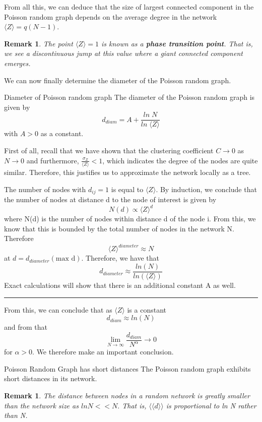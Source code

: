 \documentclass[twoside]{article}
\newtheorem{remark}[theorem]{Remark}
\newenvironment{proof}{{\bf Proof:}}{\hfill\rule{2mm}{2mm}}
\begin{document}
From all this, we can deduce that the size of largest connected component in the Poisson random graph depends on the average degree in the network $\langle Z \rangle = q(N - 1).$ 

\begin{remark}The point $\langle Z \rangle = 1$ is known as a \textbf{phase transition point}. That is, we see a discontinuous jump at this value where a giant connected component emerges.
\end{remark}

We can now finally determine the diameter of the Poisson random graph.

\begin{theorem_exam}{Diameter of Poisson random graph}{} The diameter of the Poisson random graph is given by
$$
d_{diam} = A + \frac{ln\;N}{ln\;\langle Z \rangle}
$$
with $A > 0$ as a constant.
\end{theorem_exam}
\begin{proof} 
First of all, recall that we have shown that the clustering coefficient $C \rightarrow 0$ as $N \rightarrow 0$ and furthermore, $\frac{\sigma_Z}{\langle Z \rangle} < 1$, which indicates the degree of the nodes are quite similar. Therefore, this justifies us to approximate the network locally as a tree. 

The number of nodes with $d_{ij} = 1$ is equal to $\langle Z \rangle.$ By induction, we conclude that the number of nodes at distance d to the node of interest is given by 
$$
N(d) \propto \langle Z \rangle^d
$$
where N(d) is the number of nodes within distance d of the node i. From this, we know that this is bounded by the total number of nodes in the network N. Therefore 
$$
\langle Z \rangle^{diameter} \approx N
$$
at $d = d_{diameter}(\text{max d}).$ Therefore, we have that 
$$
d_{diameter} \approx \frac{ln(N)}{ln(\langle Z \rangle)}
$$
Exact calculations will show that there is an additional constant A as well.
\end{proof}

From this, we can conclude that as $\langle Z \rangle$ is a constant 
$$
d_{diam} \approx ln(N)
$$
and from that 
$$
\lim_{N \rightarrow \infty}\frac{d_{diam}}{N^{\alpha}} \rightarrow 0
$$
for $\alpha > 0.$ We therefore make an important conclusion.
\begin{theorem_exam}{Poisson Random Graph has short distances}{} The Poisson random graph exhibits short distances in its network.
\end{theorem_exam}

\begin{remark} The distance between nodes in a random network is greatly smaller than the network size as $ln N << N.$ That is, $\langle \langle d \rangle \rangle$ is proportional to ln N rather than N.
\end{remark}
\end{document}
